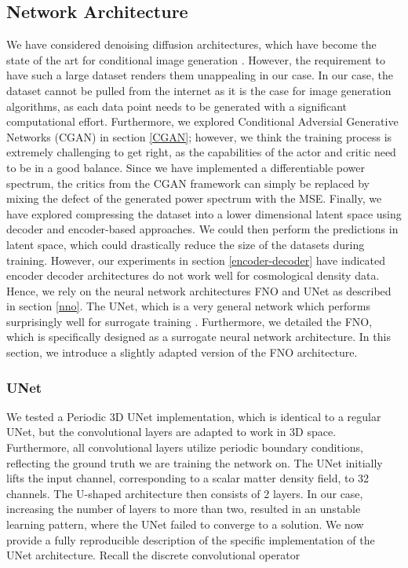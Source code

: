 \documentclass{article}
\begin{document}
\subsection{Network Architecture}

We have considered denoising diffusion architectures, which have become the state of the art for conditional image generation \citep{denoising}. However, the requirement to have such a large dataset renders them unappealing in our case. In our case, the dataset cannot be pulled from the internet as it is the case for image generation algorithms, as each data point needs to be generated with a significant computational effort. Furthermore, we explored Conditional Adversial Generative Networks ({CGAN}) in section \ref{CGAN}; however, we think the training process is extremely challenging to get right, as the capabilities of the actor and critic need to be in a good balance. Since we have implemented a differentiable power spectrum, the critics from the CGAN framework can simply be replaced by mixing the defect of the generated power spectrum with the MSE. 
Finally, we have explored compressing the dataset into a lower dimensional latent space using decoder and encoder-based approaches. We could then perform the predictions in latent space, which could drastically reduce the size of the datasets during training. However, our experiments in section \ref{encoder-decoder} have indicated encoder decoder architectures do not work well for cosmological density data. 
Hence, we rely on the neural network architectures FNO and UNet as described in section \ref{nno}. The {UNet}, which is a very general network which performs surprisingly well for surrogate training \citep{koehler2024apebench}. Furthermore, we detailed the FNO, which is specifically designed as a surrogate neural network architecture. In this section, we introduce a slightly adapted version of the FNO architecture.

\subsubsection{UNet}

We tested a Periodic 3D UNet implementation, which is identical to a regular UNet, but the convolutional layers are adapted to work in 3D space. Furthermore, all convolutional layers utilize periodic boundary conditions, reflecting the ground truth we are training the network on. The UNet initially lifts the input channel, corresponding to a scalar matter density field, to 32 channels. The U-shaped architecture then consists of 2 layers. In our case, increasing the number of layers to more than two, resulted in an unstable learning pattern, where the UNet failed to converge to a solution. We now provide a fully reproducible description of the specific implementation of the UNet architecture. Recall the discrete convolutional operator
\end{document}
